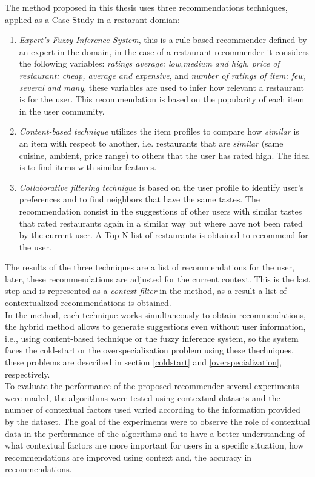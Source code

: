 The method proposed in this thesis uses three recommendations techniques,
applied as a Case Study in a restarant domian:
\begin{enumerate} 
\item \textit{Expert's Fuzzy Inference System}, this is a rule based recommender
defined by an expert in the domain, in the case of a restaurant recommender
it considers the following
variables: \textit{ratings average: low,medium and high},
\textit{price of restaurant: cheap, average and expensive}, and
\textit{number of ratings of item: few, several and many}, these
variables are used to infer how relevant a restaurant is for the user.
This recommendation is based on the popularity of each item in the
user community.
\item \textit{Content-based technique} utilizes the item profiles 
to compare how \textit{similar} is an item with respect to 
another, i.e. restaurants that are \textit{similar} (same cuisine, 
ambient, price range) to others that the user has rated high. 
The idea is to find items with similar features. 
\item \textit{Collaborative filtering technique} is based on the user
profile to identify user's preferences and to find neighbors that
have the same tastes. The recommendation consist in the suggestions of
other users with similar tastes that rated restaurants again in a
similar way but where have not been rated by the current user. A Top-N
list of restaurants is obtained to recommend for the user.
\end{enumerate} 
The results of the three techniques are a list of recommendations for
the user, later, these recommendations are adjusted for the current context. This
is the last step and is represented as a \textit{context filter} in the
method, as a result a list of contextualized
recommendations is obtained. \\
In the method, each technique works simultaneously to obtain
recommendations, the hybrid method allows to generate suggestions even
without user information, i.e., using content-based technique or the
fuzzy inference system, so the system faces the cold-start or the
overspecialization problem using these thechniques, these problems are
described in section \ref{coldstart} and 
\ref{overspecialization}, respectively.\\
To evaluate the performance of the proposed recommender several experiments
were maded, the algorithms were tested using contextual datasets and
the number of contextual factors used varied according to the information
provided by the dataset. The goal of the experiments were to observe
the role of contextual data  in the performance of the algorithms and to 
have a better understanding of what contextual
factors are more important for users in a specific situation, how recommendations
are improved using context and, the accuracy in recommendations.

